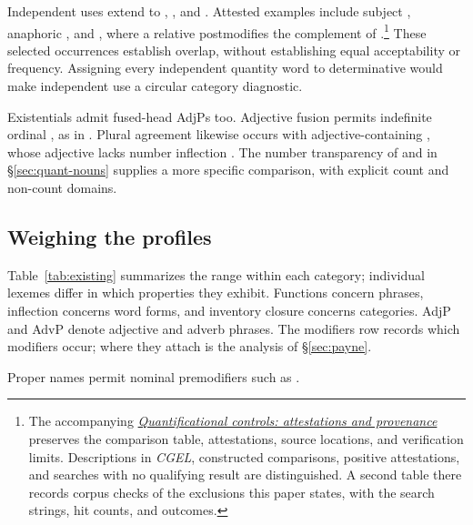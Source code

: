 \documentclass[12pt]{article}
\begin{document}
Independent uses extend to , , and . Attested examples include subject , anaphoric , and , where a relative postmodifies the complement of .\footnote{The accompanying \href{run:quantifier-controls.pdf}{\textit{Quantificational controls: attestations and provenance}} preserves the comparison table, attestations, source locations, and verification limits. Descriptions in \textit{CGEL}, constructed comparisons, positive attestations, and searches with no qualifying result are distinguished. A second table there records corpus checks of the exclusions this paper states, with the search strings, hit counts, and outcomes.} These selected occurrences establish overlap, without establishing equal acceptability or frequency. Assigning every independent quantity word to determinative would make independent use a circular category diagnostic.

Existentials admit fused-head AdjPs too. Adjective fusion permits indefinite ordinal  \citep[416]{huddleston2002}, as in . Plural agreement likewise occurs with adjective-containing , whose adjective lacks number inflection \citep[418]{huddleston2002}. The number transparency of  and  in §\ref{sec:quant-nouns} supplies a more specific comparison, with explicit count and non-count domains.

\subsection{Weighing the profiles}\label{sec:membership}

Table~\ref{tab:existing} summarizes the range within each category; individual lexemes differ in which properties they exhibit. Functions concern phrases, inflection concerns word forms, and inventory closure concerns categories. AdjP and AdvP denote adjective and adverb phrases. The modifiers row records which modifiers occur; where they attach is the analysis of §\ref{sec:payne}.

Proper names permit nominal premodifiers such as  \citep[517--518]{huddleston2002}.
\end{document}
